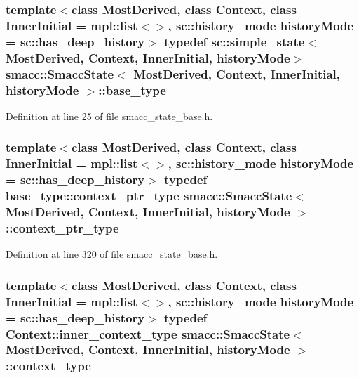 \subsubsection[{\texorpdfstring{base\+\_\+type}{base_type}}]{\setlength{\rightskip}{0pt plus 5cm}template$<$class Most\+Derived, class Context, class Inner\+Initial = mpl\+::list$<$$>$, sc\+::history\+\_\+mode history\+Mode = sc\+::has\+\_\+deep\+\_\+history$>$ typedef sc\+::simple\+\_\+state$<$Most\+Derived, Context, Inner\+Initial, history\+Mode$>$ {\bf smacc\+::\+Smacc\+State}$<$ Most\+Derived, Context, Inner\+Initial, history\+Mode $>$\+::{\bf base\+\_\+type}\hspace{0.3cm}{\ttfamily [private]}}\hypertarget{classsmacc_1_1SmaccState_a68f547c6fe147554bbe607b6fcd8e40a}{}\label{classsmacc_1_1SmaccState_a68f547c6fe147554bbe607b6fcd8e40a}


Definition at line 25 of file smacc\+\_\+state\+\_\+base.\+h.

\subsubsection[{\texorpdfstring{context\+\_\+ptr\+\_\+type}{context_ptr_type}}]{\setlength{\rightskip}{0pt plus 5cm}template$<$class Most\+Derived, class Context, class Inner\+Initial = mpl\+::list$<$$>$, sc\+::history\+\_\+mode history\+Mode = sc\+::has\+\_\+deep\+\_\+history$>$ typedef base\+\_\+type\+::context\+\_\+ptr\+\_\+type {\bf smacc\+::\+Smacc\+State}$<$ Most\+Derived, Context, Inner\+Initial, history\+Mode $>$\+::{\bf context\+\_\+ptr\+\_\+type}}\hypertarget{classsmacc_1_1SmaccState_a0e15b77514301039f6bc093a9d3f6425}{}\label{classsmacc_1_1SmaccState_a0e15b77514301039f6bc093a9d3f6425}


Definition at line 320 of file smacc\+\_\+state\+\_\+base.\+h.

\subsubsection[{\texorpdfstring{context\+\_\+type}{context_type}}]{\setlength{\rightskip}{0pt plus 5cm}template$<$class Most\+Derived, class Context, class Inner\+Initial = mpl\+::list$<$$>$, sc\+::history\+\_\+mode history\+Mode = sc\+::has\+\_\+deep\+\_\+history$>$ typedef Context\+::inner\+\_\+context\+\_\+type {\bf smacc\+::\+Smacc\+State}$<$ Most\+Derived, Context, Inner\+Initial, history\+Mode $>$\+::{\bf context\+\_\+type}}\hypertarget{classsmacc_1_1SmaccState_a65c128d05dbcadbf817f41ba20b8fa01}{}\label{classsmacc_1_1SmaccState_a65c128d05dbcadbf817f41ba20b8fa01}


